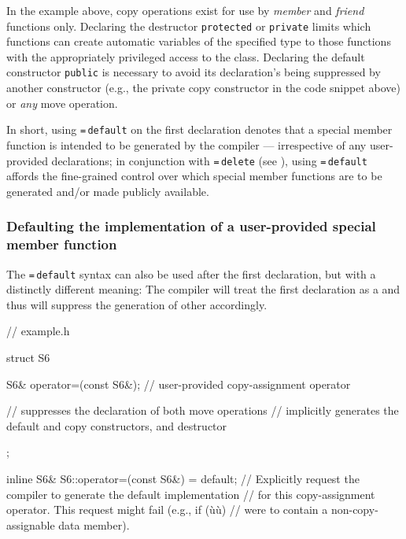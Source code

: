 \noindent In the example above, copy operations exist for use by \emph{member} and
\emph{friend} functions only. Declaring the destructor
\lstinline!protected! or \lstinline!private! limits which functions can create
automatic variables of the specified type to those functions with the
appropriately privileged access to the class. Declaring the default
constructor \lstinline!public! is necessary to avoid its declaration's
being suppressed by another constructor (e.g., the private copy
constructor in the code snippet above) or \emph{any} move operation.

In short, using \lstinline!=!\,\lstinline!default! on the first declaration
denotes that a special member function is intended to be generated by
the compiler --- irrespective of any user-provided declarations; in
conjunction with {\lstinline!=!\,\lstinline!delete!} (see ),
using
\lstinline!=!\,\lstinline!default! affords the fine-grained control over which
special member functions are to be generated and/or made publicly
available.

\subsubsection[Defaulting the implementation of a user-provided special member function]{Defaulting the implementation of a user-provided special member function}\label{defaulting-the-implementation-of-a-user-provided-special-member-function}

The \lstinline!=!\,\lstinline!default! syntax can also be used after the first
declaration, but with a distinctly different meaning: The compiler will
treat the first declaration as a  and thus will suppress the generation of other
 accordingly.

\begin{emcppslisting}[language=C++,label=default-exampleh-code]
// example.h

struct S6
{
    S6& operator=(const S6&);  // user-provided copy-assignment operator

    // suppresses the declaration of both move operations
    // implicitly generates the default and copy constructors, and destructor
};

inline S6& S6::operator=(const S6&) = default;
    // Explicitly request the compiler to generate the default implementation
    // for this copy-assignment operator. This request might fail (e.g., if (ù{}ù)
    // were to contain a non-copy-assignable data member).
\end{emcppslisting}
    
